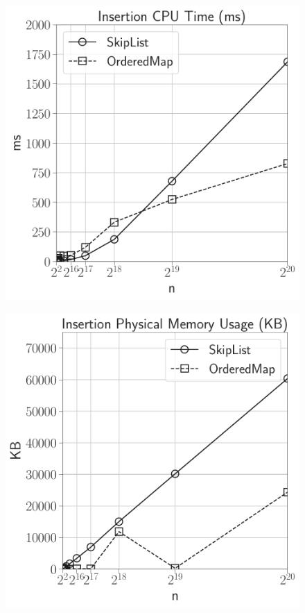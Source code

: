 \documentclass[12pt]{article}
\begin{document}
\begin{figure}[H]
	\centering

	\begin{minipage}{0.32\textwidth}
		\centering
		\includegraphics[width=\linewidth]{../notebook/plot/sl_liminsertion_cpu_time_(ms).pdf}
		\label{fig:cpu_time}
	\end{minipage}\hfill
	\begin{minipage}{0.32\textwidth}
		\centering
		\includegraphics[width=\linewidth]{../notebook/plot/sl_liminsertion_physical_memory_usage_(kb).pdf}

\end{minipage}
\end{figure}
\end{document}
